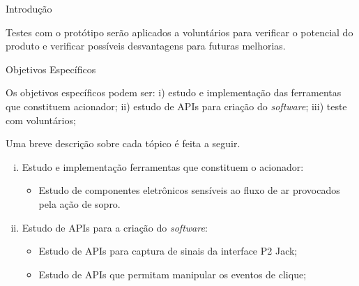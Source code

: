 \begin{chapter}{Introdução}

Testes com o protótipo serão aplicados a voluntários para verificar o potencial
do produto e verificar possíveis desvantagens para futuras melhorias.

\begin{subsection}{Objetivos Específicos}

Os objetivos específicos podem ser:
i) estudo e implementação das ferramentas que constituem acionador;
ii) estudo de APIs para criação do \textit{software};
iii) teste com voluntários;

Uma breve descrição sobre cada tópico é feita a seguir.

\begin{enumerate}[i)]

\setlength\itemsep{-.2cm}
	\item Estudo e implementação ferramentas que constituem o acionador: \vspace{-.2cm}
	\begin{itemize}
		\item Estudo de componentes eletrônicos sensíveis ao fluxo de ar
provocados pela ação de sopro.
	\end{itemize}

	\item Estudo de APIs para a criação do \textit{software}: \vspace{-.2cm}
	\begin{itemize}
		\item Estudo de APIs para captura de sinais da interface P2 Jack;
		\item Estudo de APIs que permitam manipular os eventos de clique;
	\end{itemize}


\end{enumerate}
\end{subsection}
\end{chapter}

